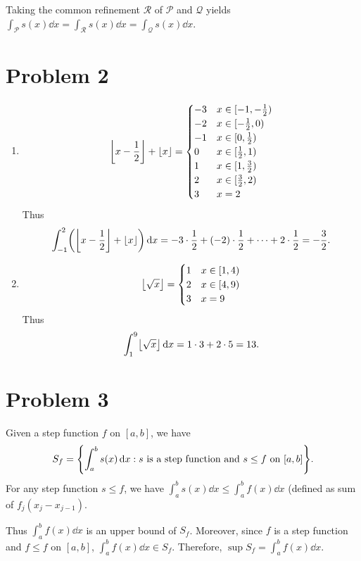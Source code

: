 \documentclass[12pt]{article}
\begin{document}
Taking the common refinement $\mathcal{R}$ of $\mathcal{P}$ and $\mathcal{Q}$ yields $\int_{\mathcal{P}} s(x) \dd x = \int_{\mathcal{R}} s(x) \dd x = \int_{\mathcal{Q}} s(x) \dd x$.


\section*{Problem 2}
\begin{enumerate}[label=(\alph*)]
    \item \[
        \floor{x-\frac{1}{2}} + \floor{x} = 
        \begin{cases}
            -3 & x \in [-1, -\frac{1}{2}) \\
            -2 & x \in [-\frac{1}{2}, 0) \\
            -1 & x \in [0, \frac{1}{2}) \\
            0 & x \in [\frac{1}{2}, 1) \\
            1 & x \in [1, \frac{3}{2}) \\
            2 & x \in [\frac{3}{2}, 2) \\
            3 & x = 2
        \end{cases}
    \] Thus \[
        \int_{-1}^{2} \paren{\floor{x-\frac{1}{2}} + \floor{x}} \dd x = -3 \cdot \frac{1}{2} + (-2) \cdot \frac{1}{2} + \dots + 2 \cdot \frac{1}{2} = -\frac{3}{2}.
    \] \item \[
        \floor{\sqrt{x}} =
        \begin{cases}
            1 & x \in [1, 4) \\
            2 & x \in [4, 9) \\
            3 & x = 9
        \end{cases}
    \] Thus \[
        \int_{1}^{9} \floor{\sqrt{x}} \dd x = 1 \cdot 3 + 2 \cdot 5 = 13.
    \]
\end{enumerate}


\section*{Problem 3}
Given a step function $f$ on $[a, b]$, we have \[
    S_{f} = \set{\int_{a}^{b} s(x) \dd x : s \text{ is a step function and } s \leq f \text{ on } [a, b]}.
\] For any step function $s \leq f$, we have $\int_{a}^{b} s(x) \dd x \leq \int_{a}^{b} f(x) \dd x$ (defined as sum of $f_{j} (x_{j} - x_{j-1})$.

Thus $\int_{a}^{b} f(x) \dd x$ is an upper bound of $S_{f}$. Moreover, since $f$ is a step function and $f \leq f$ on $[a, b]$, $\int_{a}^{b} f(x) \dd x \in S_{f}$.
Therefore, $\sup S_{f} = \int_{a}^{b} f(x) \dd x$.
\end{document}
